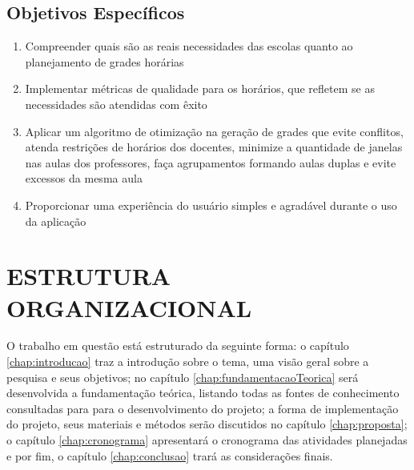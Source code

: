 \subsection{Objetivos Específicos}

\begin{enumerate}
	\item Compreender quais são as reais necessidades das escolas quanto ao planejamento de grades horárias
	\item Implementar métricas de qualidade para os horários, que refletem se as necessidades são atendidas com êxito
	\item Aplicar um algoritmo de otimização na geração de grades que evite conflitos, atenda restrições de horários dos docentes, minimize a quantidade de janelas nas aulas dos professores, faça agrupamentos formando aulas duplas e evite excessos da mesma aula
	\item Proporcionar uma experiência do usuário simples e agradável durante o uso da aplicação
\end{enumerate}

\section{ESTRUTURA ORGANIZACIONAL}

O trabalho em questão está estruturado da seguinte forma: o capítulo \ref{chap:introducao} traz a introdução sobre o tema, uma visão geral sobre a pesquisa e seus objetivos; no capítulo \ref{chap:fundamentacaoTeorica} será desenvolvida a fundamentação teórica, listando todas as fontes de conhecimento consultadas para para o desenvolvimento do projeto; a forma de implementação do projeto, seus materiais e métodos serão discutidos no capítulo \ref{chap:proposta}; o capítulo \ref{chap:cronograma} apresentará o cronograma das atividades planejadas e por fim, o capítulo \ref{chap:conclusao} trará as considerações finais.

